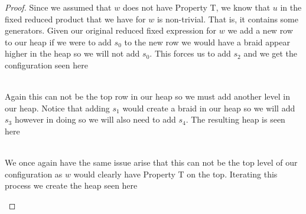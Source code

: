 \begin{theorem}
\begin{proof}
	Since we assumed that $w$ does not have Property T, we know that $u$ in the fixed reduced product that we have for $w$ is non-trivial. That is, it contains some generators. Given our original reduced fixed expression for $w$ we add a new row to our heap if we were to add $s_0$ to the new row we would have a braid appear higher in the heap so we will not add $s_0$. This forces us to add $s_2$ and we get the configuration seen here \begin{figure}[h!] \centering
{}\label{fig:heap2}
\end{figure}\\
Again this can not be the top row in our heap so we must add another level in our heap. Notice that adding $s_1$ would create a braid in our heap so we will add $s_3$ however in doing so we will also need to add $s_4$. The resulting heap is seen here \begin{figure}[h!] \centering
{}\label{fig:heap3}
\end{figure}\\

We once again have the same issue arise that this can not be the top level of our configuration as $w$ would clearly have Property T on the top. Iterating this process we create the heap seen here
\begin{figure}[h!] \centering
{}
\end{figure}
\end{proof}
\end{theorem}
